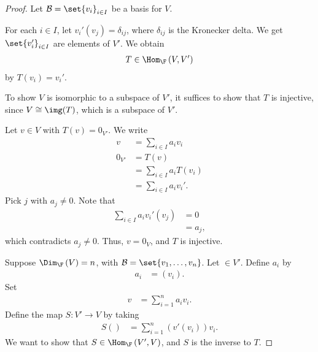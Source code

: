 \documentclass[10pt]{mypackage}
\begin{document}
\begin{proof}
  Let $\mathcal{B} = \set{v_i}_{i\in I}$ be a basis for $V$.\newline

  For each $i\in I$, let $v_i'(v_j) = \delta_{ij}$, where $\delta_{ij}$ is the Kronecker delta. We get $\set{v_i'}_{i\in I}$ are elements of $V'$. We obtain
  \begin{align*}
    T\in \Hom_{\F}\left(V,V'\right)
  \end{align*}
  by $T\left(v_i\right) = v_i'$.\newline

  To show $V$ is isomorphic to a subspace of $V'$, it suffices to show that $T$ is injective, since $V\cong \img(T)$, which is a subspace of $V'$.\newline

  Let $v\in V$ with $T(v) = 0_{V'}$. We write
  \begin{align*}
    v &= \sum_{i\in I}a_iv_i\\
    0_{V'}&= T(v)\\
                    &= \sum_{i\in I}a_iT\left(v_i\right)\\
                    &= \sum_{i\in I}a_iv_i'.
  \end{align*}
  Pick $j$ with $a_j\neq 0$. Note that
  \begin{align*}
    \sum_{i\in I}a_iv_i'(v_j) &= 0\\
                              &= a_j,
  \end{align*}
  which contradicts $a_j\neq 0$. Thus, $v = 0_V$, and $T$ is injective.\newline

  Suppose $\Dim_{\F}\left(V\right) = n$, with $\mathcal{B} = \set{v_1,\dots,v_n}$. Let $\in V'$. Define $a_i$ by
  \begin{align*}
    a_i &= \left(v_i\right).
  \end{align*}
  Set
  \begin{align*}
    v &= \sum_{i=1}^{n}a_iv_i.
  \end{align*}
  Define the map $S: V'\rightarrow V$ by taking
  \begin{align*}
    S\left(\right) &= \sum_{i=1}^{n}\left(v'\left(v_i\right)\right)v_i.
  \end{align*}
  We want to show that $S\in \Hom_{\F}\left(V',V\right)$, and $S$ is the inverse to $T$.\newline


\end{proof}
\end{document}
